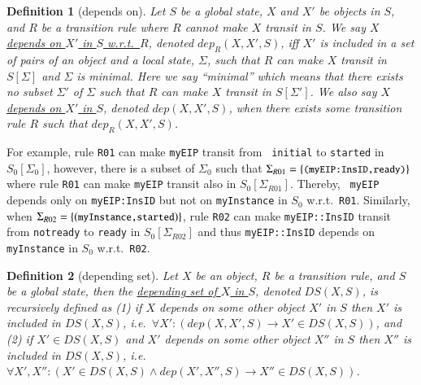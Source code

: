 \documentclass[12pt]{report}
\newtheorem{definition}{Definition}
\newcommand{\ra}{\rightarrow}
\newcommand{\mbstt}[1]{\mbox{\small{\tt {#1}}}}
\newcommand{\ul}{\underline}
\begin{document}
\begin{definition}[depends on]
Let $S$ be a global state, $X$ and $X'$ be objects in $S$, and $R$ be
a transition rule where $R$ cannot make $X$ transit in $S$.  We say
\ul{$X$ depends on $X'$ in $S$ w.r.t.\ $R$}, denoted \ul{$dep_R(X,
  X',S)$}, iff $X'$ is included in a set of pairs of an object and a
local state, $\Sigma$, such that $R$ can make $X$ transit in
$S[\Sigma]$ and $\Sigma$ is minimal.  Here we say ``minimal'' which
means that there exists no subset $\Sigma'$ of $\Sigma$ such that $R$
can make $X$ transit in $S[\Sigma']$. We also say \ul{$X$ depends on
  $X'$ in $S$}, denoted \ul{$dep(X, X',S)$}, when there exists some
transition rule $R$ such that $dep_R(X,X',S)$.
\end{definition}
For example, rule {\tt R01} can make {\tt myEIP} transit from {\tt
  initial} to {\tt started} in $S_0[\Sigma_0]$, however, there is a
subset of $\Sigma_0$ such that
$\Sigma_{R01}=\{\mbstt{(myEIP:InsID,ready)}\}$ where rule {\tt R01}
can make {\tt myEIP} transit also in $S_0[\Sigma_{R01}]$. Thereby, {\tt
  myEIP} depends only on {\tt myEIP:InsID} but not on {\tt myInstance}
in $S_0$ w.r.t.\ {\tt R01}. Similarly, when
$\Sigma_{R02}=\{(\mbstt{myInstance,started})\}$, rule {\tt R02} can
make {\tt myEIP::InsID} transit from {\tt notready} to {\tt ready} in
$S_0[\Sigma_{R02}]$ and thus {\tt myEIP::InsID} depends on {\tt
  myInstance} in $S_0$ w.r.t.\ {\tt R02}.

\begin{definition}[depending set]
Let $X$ be an object, $R$ be a transition rule, and $S$ be a global
state, then the \ul{depending set of $X$ in $S$}, denoted
\ul{$DS(X,S)$}, is recursively defined as (1) if $X$ depends on some
other object $X'$ in $S$ then $X'$ is included in
$DS(X,S)$, i.e.\ $\forall X': (dep(X,X',S) \ra X'\in DS(X,S))$, and
(2) if $X' \in DS(X,S)$ and $X'$ depends on some other object $X''$
in $S$ then $X''$ is included in $DS(X,S)$, i.e.\ $\forall
X',X'': (X'\in DS(X,S) \land dep(X',X'',S) \ra X''\in DS(X,S))$.
\end{definition}
\end{document}
